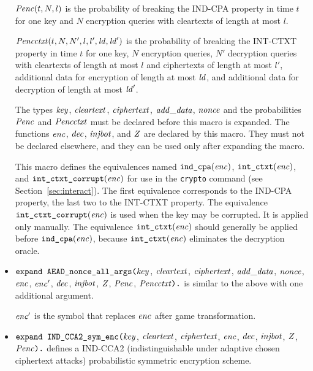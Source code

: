 \documentclass{article}
\begin{document}
\begin{itemize}
  $\mathit{Penc}(t, N, l)$ is the probability of breaking the IND-CPA
  property in time $t$ for one key and $N$ encryption queries with
  cleartexts of length at most $l$.

  $\mathit{Pencctxt}(t, N, N', l, l', \mathit{ld}, \mathit{ld}')$ is the probability of
  breaking the INT-CTXT property in time $t$ for one key, $N$
  encryption queries, $N'$ decryption queries with cleartexts of
  length at most $l$ and ciphertexts of length at most $l'$,
  additional data for encryption of length at most $\mathit{ld}$, and
  additional data for decryption of length at most $\mathit{ld}'$.

   The types $\mathit{key}$, $\mathit{cleartext}$,
   $\mathit{ciphertext}$, $\mathit{add\_data}$, $\mathit{nonce}$ and the probabilities $\mathit{Penc}$ and $\mathit{Pencctxt}$ must
   be declared before this macro is expanded. The functions
   $\mathit{enc}$, $\mathit{dec}$, $\mathit{injbot}$, and $\mathit{Z}$ are declared by this
   macro. They must not be declared elsewhere, and they can be used
   only after expanding the macro.

   This macro defines the equivalences named $\texttt{ind\_cpa}(\mathit{enc})$,
   $\texttt{int\_ctxt}(\mathit{enc})$, and $\texttt{int\_ctxt\_corrupt}(\mathit{enc})$ 
   for use in the \texttt{crypto} command 
   (see Section~\ref{sec:interact}). 
   The first equivalence corresponds to the
   IND-CPA property, the last two to the INT-CTXT property.
   The equivalence $\texttt{int\_ctxt\_corrupt}(\mathit{enc})$ is used when the
   key may be corrupted. It is applied only manually.
   The equivalence $\texttt{int\_ctxt}(\mathit{enc})$
   should generally be applied before $\texttt{ind\_cpa}(\mathit{enc})$,
   because $\texttt{int\_ctxt}(\mathit{enc})$ eliminates the decryption oracle.

\item $\texttt{expand AEAD\_nonce\_all\_args(}\mathit{key}$,
$  \mathit{cleartext}$, $\mathit{ciphertext}$, $\mathit{add\_data}$, $\mathit{nonce}$, $\mathit{enc}$, $\mathit{enc}'$,
$  \mathit{dec}$, $\mathit{injbot}$, $\mathit{Z}$, $\mathit{Penc}$, $\mathit{Pencctxt}\texttt{).}$ is similar to the above with one additional argument.

  $\mathit{enc}'$ is the symbol that replaces $\mathit{enc}$ after game transformation.


\item $\texttt{expand IND\_CCA2\_sym\_enc(}\mathit{key}$,
$  \mathit{cleartext}$, $\mathit{ciphertext}$, $\mathit{enc}$,
$  \mathit{dec}$, $\mathit{injbot}$, $\mathit{Z}$, $\mathit{Penc}\texttt{).}$ defines a
  IND-CCA2 (indistinguishable under adaptive chosen ciphertext attacks)
  probabilistic symmetric encryption scheme.


\end{itemize}
\end{document}

